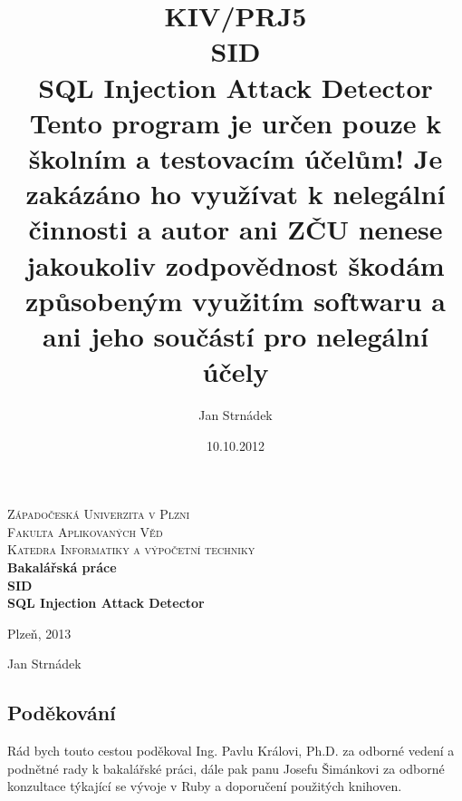 \documentclass[12pt, a4paper]{report}
\begin{document}
\author{Jan Strnádek}
\date{10.10.2012}
\title{KIV/PRJ5\\SID\\\small{SQL Injection Attack Detector\\Tento program je určen pouze k školním a testovacím účelům! Je zakázáno ho využívat k nelegální činnosti a autor ani ZČU nenese jakoukoliv zodpovědnost škodám způsobeným využitím softwaru a ani jeho součástí pro nelegální účely}}
\begin{titlepage}
\begin{center}
\textsc{\Large Západočeská Univerzita v Plzni}
\\[0.3cm]
\textsc{\Large Fakulta Aplikovaných Věd}
\\[0.3cm]
\textsc{\Large Katedra Informatiky a výpočetní techniky}
\\[6cm]
\textbf{\LARGE Bakalářská práce}
\\[3cm]
\textbf{\LARGE SID\\[0.3cm] SQL Injection Attack Detector}
\\[6cm]
\begin{minipage}{0.4\textwidth}
\begin{flushleft}
\large
Plzeň, 2013
\end{flushleft}
\end{minipage}
\begin{minipage}{0.4\textwidth}
\begin{flushright} 
Jan Strnádek
\end{flushright}
\end{minipage}
\vfill
\end{center}
\end{titlepage}
\tableofcontents
\newpage
\thispagestyle{empty}
\subsection*{Poděkování}
Rád bych touto cestou poděkoval Ing. Pavlu Královi, Ph.D. za odborné vedení a podnětné rady k bakalářské práci, dále pak panu Josefu Šimánkovi za odborné konzultace týkající se vývoje v Ruby a doporučení použitých knihoven.
\\[9cm]
\end{document}

